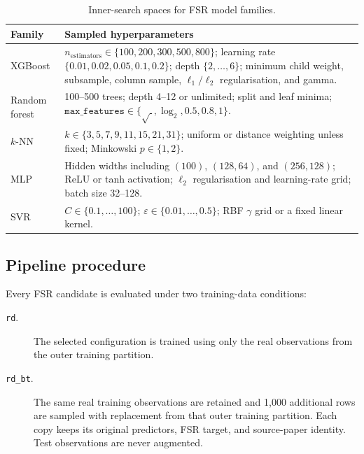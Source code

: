 \begin{table}[htbp]
  \centering
  \small
  \caption{Inner-search spaces for FSR model families.}
  \label{tab:fsr-search}
  \begin{tabular}{@{}lp{}@{}}
  \toprule
  Family & Sampled hyperparameters \\
  \midrule
  XGBoost &
  \(n_{\mathrm{estimators}}\in\{100,200,300,500,800\}\); learning rate
  \(\{0.01,0.02,0.05,0.1,0.2\}\); depth \(\{2,\ldots,6\}\);
  minimum child weight, subsample, column sample, \(\ell_1/\ell_2\)
  regularisation, and gamma. \\

  Random forest &
  100--500 trees; depth 4--12 or unlimited; split and leaf minima;
  \(\texttt{max\_features}\in\{\sqrt{\ },\log_2,0.5,0.8,1\}\). \\

  \(k\)-NN &
  \(k\in\{3,5,7,9,11,15,21,31\}\); uniform or distance weighting unless
  fixed; Minkowski \(p\in\{1,2\}\). \\

  MLP &
  Hidden widths including \((100)\), \((128,64)\), and \((256,128)\);
  ReLU or tanh activation; \(\ell_2\) regularisation and learning-rate grid;
  batch size 32--128. \\

  SVR &
  \(C\in\{0.1,\ldots,100\}\); \(\varepsilon\in\{0.01,\ldots,0.5\}\);
  RBF \(\gamma\) grid or a fixed linear kernel. \\
  \bottomrule
  \end{tabular}
\end{table}

\subsection{Pipeline procedure}

Every FSR candidate is evaluated under two training-data conditions:

\begin{description}
  \item[\texttt{rd}.]
  The selected configuration is trained using only the real observations from
  the outer training partition.

  \item[\texttt{rd\_bt}.]
  The same real training observations are retained and 1,000 additional rows
  are sampled with replacement from that outer training partition. Each copy
  keeps its original predictors, FSR target, and source-paper identity. Test
  observations are never augmented.
\end{description}

